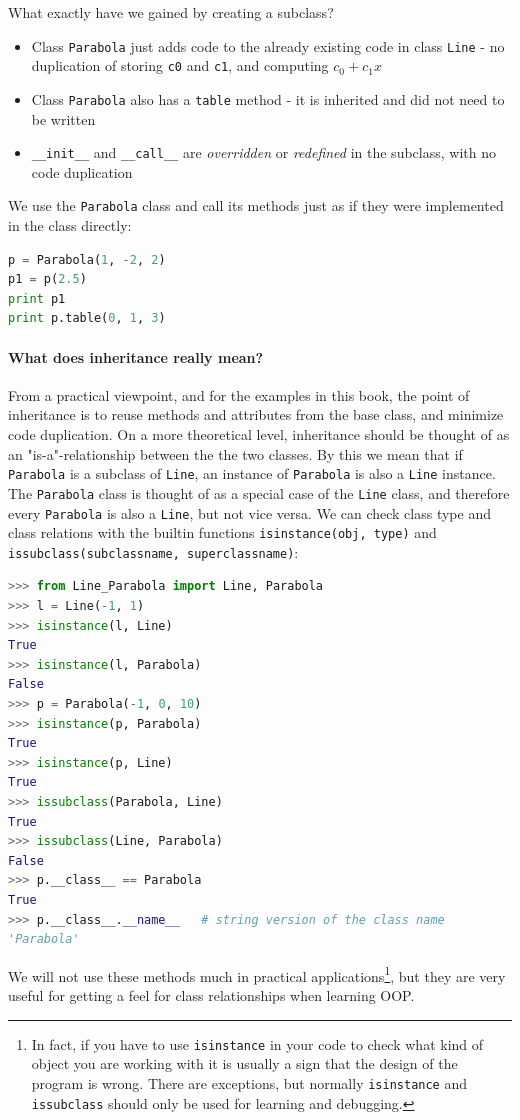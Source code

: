 \documentclass[graybox,envcountchap,sectrefs,final]{svmonodo}
\begin{document}
What exactly have we gained by creating a subclass?
\begin{itemize}
  \item Class \texttt{Parabola} just adds code to the already existing code in class \texttt{Line} - no duplication of storing \texttt{c0} and \texttt{c1}, and computing $c_0+c_1x$

  \item Class \texttt{Parabola} also has a \texttt{table} method - it is inherited and did not need to be written

  \item \Verb!__init__! and \Verb!__call__! are \emph{overridden} or \emph{redefined} in the subclass, with no code duplication
\end{itemize}

\noindent
We use the \texttt{Parabola} class and call its methods just as if they were implemented in the class directly:
\begin{lstlisting}[language=Python,style=blue1]
p = Parabola(1, -2, 2)
p1 = p(2.5)
print p1
print p.table(0, 1, 3)
\end{lstlisting}

\paragraph{What does inheritance really mean?}
From a practical viewpoint, and for the examples in this book, the point of inheritance is to reuse methods and attributes from the
base class, and minimize code duplication. On a more theoretical level, inheritance should be thought of as an "is-a"-relationship between the
the two classes. By this we mean that if \texttt{Parabola} is a subclass of \texttt{Line}, an instance of \texttt{Parabola} is also a \texttt{Line} instance. The \texttt{Parabola} class
is thought of as a special case of the \texttt{Line} class, and therefore every \texttt{Parabola} is also a \texttt{Line}, but not vice versa. We can
check class type and class relations with the builtin functions \texttt{isinstance(obj, type)} and \texttt{issubclass(subclassname, superclassname)}:
\begin{lstlisting}[language=Python,style=blue1]
>>> from Line_Parabola import Line, Parabola
>>> l = Line(-1, 1)
>>> isinstance(l, Line)
True
>>> isinstance(l, Parabola)
False
>>> p = Parabola(-1, 0, 10)
>>> isinstance(p, Parabola)
True
>>> isinstance(p, Line)
True
>>> issubclass(Parabola, Line)
True
>>> issubclass(Line, Parabola)
False
>>> p.__class__ == Parabola
True
>>> p.__class__.__name__   # string version of the class name
'Parabola'
\end{lstlisting}
We will not use these methods much in practical applications\footnote{In fact, if you have to use \texttt{isinstance} in your code to check what kind of object you are working with it is usually a sign that the design of the program is wrong. There are exceptions, but normally \texttt{isinstance} and \texttt{issubclass} should only be used for learning and debugging.}, but they are very useful for getting a feel for class relationships when
learning OOP.
\end{document}
